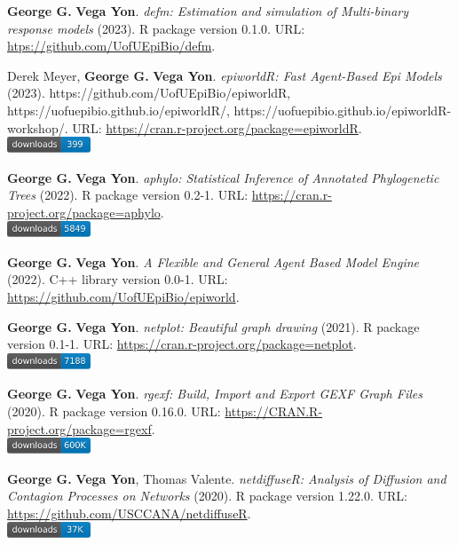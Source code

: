 \item \textbf{George G.} \textbf{Vega Yon}. \textit{defm: Estimation and simulation of Multi-binary response models} (2023). R package version 0.1.0. {\small URL}: \url{htps://github.com/UofUEpiBio/defm}.  
\item Derek Meyer, \textbf{George G.} \textbf{Vega Yon}. \textit{epiworldR: Fast Agent-Based Epi Models} (2023). https://github.com/UofUEpiBio/epiworldR,
https://uofuepibio.github.io/epiworldR/,
https://uofuepibio.github.io/epiworldR-workshop/. {\small URL}: \url{https://cran.r-project.org/package=epiworldR}. \\\includegraphics[width=2.5cm]{fig/cran-downloads-epiworldr.pdf} 
\item \textbf{George G.} \textbf{Vega Yon}. \textit{aphylo: Statistical Inference of Annotated Phylogenetic Trees} (2022). R package version 0.2-1. {\small URL}: \url{https://cran.r-project.org/package=aphylo}. \\\includegraphics[width=2.5cm]{fig/cran-downloads-aphylo.pdf} 
\item \textbf{George G.} \textbf{Vega Yon}. \textit{A Flexible and General Agent Based Model Engine} (2022). C++ library version 0.0-1. {\small URL}: \url{https://github.com/UofUEpiBio/epiworld}.  
\item \textbf{George G.} \textbf{Vega Yon}. \textit{netplot: Beautiful graph drawing} (2021). R package version 0.1-1. {\small URL}: \url{https://cran.r-project.org/package=netplot}. \\\includegraphics[width=2.5cm]{fig/cran-downloads-netplot.pdf} 
\item \textbf{George G.} \textbf{Vega Yon}. \textit{rgexf: Build, Import and Export GEXF Graph Files} (2020). R package version 0.16.0. {\small URL}: \url{https://CRAN.R-project.org/package=rgexf}. \\\includegraphics[width=2.5cm]{fig/cran-downloads-rgexf.pdf} 
\item \textbf{George G.} \textbf{Vega Yon}, Thomas Valente. \textit{{{netdiffuseR: Analysis of Diffusion and Contagion Processes on Networks}}} (2020). R package version 1.22.0. {\small URL}: \url{https://github.com/USCCANA/netdiffuseR}. \\\includegraphics[width=2.5cm]{fig/cran-downloads-netdiffuser.pdf} 
